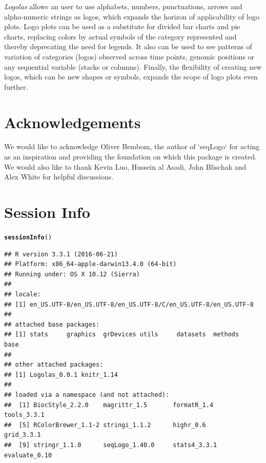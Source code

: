 \documentclass[12pt]{article}\usepackage[]{graphicx}\usepackage[usenames,dvipsnames]{color}
\makeatletter
\newcommand{\hlstd}[1]{\textcolor[rgb]{0.345,0.345,0.345}{#1}}%
\newcommand{\hlkwd}[1]{\textcolor[rgb]{0.737,0.353,0.396}{\textbf{#1}}}%
\newenvironment{kframe}{%
 \def\at@end@of@kframe{}%
 \ifinner\ifhmode%
  \def\at@end@of@kframe{\end{minipage}}%
  \begin{minipage}{\columnwidth}%
 \fi\fi%
 \def\FrameCommand##1{\hskip\@totalleftmargin \hskip-\fboxsep
 \colorbox{shadecolor}{##1}\hskip-\fboxsep
     \hskip-\linewidth \hskip-\@totalleftmargin \hskip\columnwidth}%
 \MakeFramed {\advance\hsize-\width
   \@totalleftmargin\z@ \linewidth\hsize
   \@setminipage}}%
 {\par\unskip\endMakeFramed%
 \at@end@of@kframe}
\newenvironment{knitrout}{}{} %
\newcommand{\Logolas}{\textit{Logolas}}
\makeatother
\begin{document}
\Logolas{} allows an user to use alphabets, numbers, punctuations, arrows and alpha-numeric strings as logos, which expands the horizon of applicability of logo plots. Logo plots can be used as a substitute for divided bar charts and pie charts, replacing colors by actual symbols of the category represented and thereby deprecating the need for legends. It also can be used to see patterns of variation of categories (logos) observed across time points, genomic positions or any sequential variable (stacks or columns). Finally, the flexibility of creating new logos, which can be new shapes or symbols, expands the scope of logo plots even further.

\section{Acknowledgements}

We would like to acknowledge Oliver Bembom, the author of `seqLogo` for acting as an inspiration and providing the foundation on which this package is created. We would also like to thank Kevin Luo, Hussein al Asadi, John Blischak and Alex White
for helpful discussions.

\section{Session Info}

\begin{knitrout}
\color{fgcolor}\begin{kframe}
\begin{alltt}
\hlkwd{sessionInfo}\hlstd{()}
\end{alltt}
\begin{verbatim}
## R version 3.3.1 (2016-06-21)
## Platform: x86_64-apple-darwin13.4.0 (64-bit)
## Running under: OS X 10.12 (Sierra)
## 
## locale:
## [1] en_US.UTF-8/en_US.UTF-8/en_US.UTF-8/C/en_US.UTF-8/en_US.UTF-8
## 
## attached base packages:
## [1] stats     graphics  grDevices utils     datasets  methods   base     
## 
## other attached packages:
## [1] Logolas_0.0.1 knitr_1.14   
## 
## loaded via a namespace (and not attached):
##  [1] BiocStyle_2.2.0    magrittr_1.5       formatR_1.4        tools_3.3.1       
##  [5] RColorBrewer_1.1-2 stringi_1.1.2      highr_0.6          grid_3.3.1        
##  [9] stringr_1.1.0      seqLogo_1.40.0     stats4_3.3.1       evaluate_0.10
\end{verbatim}
\end{kframe}
\end{knitrout}
\end{document}
